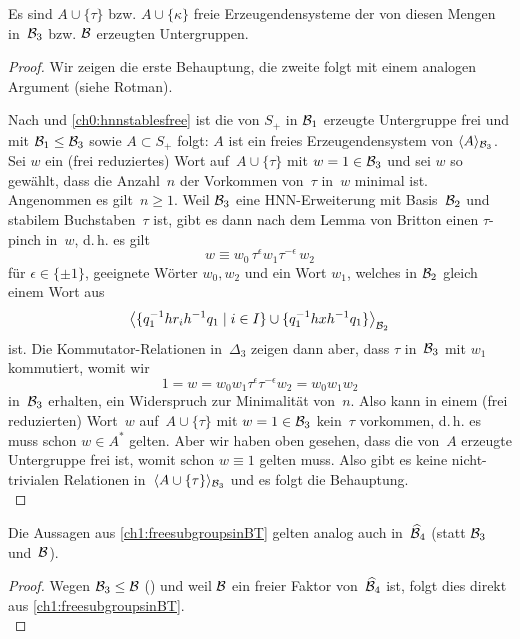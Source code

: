 \begin{thLemma}\label{ch1:freesubgroupsinBT}
    Es sind $A\cup\{\tau\}$ bzw. $A\cup\{\kappa\}$ freie
    Erzeugendensysteme der von diesen Mengen in~$\BT_3$ bzw.
    $\BT$ erzeugten Untergruppen.
\end{thLemma}
%
\begin{proof}
    Wir zeigen die erste Behauptung, die zweite folgt mit einem
    analogen Argument (siehe Rotman\cite[Lemma~12.21]{bookc:rotman95}).
    
    Nach  und \cref{ch0:hnnstablesfree}
    ist die von $S_+$ in $\BT_1$ erzeugte Untergruppe frei
    und mit $\BT_1 \leq \BT_3$ sowie $A\subset S_+$ folgt:
    $A$ ist ein freies Erzeugendensystem von $\Spann{A}_{\BT_3}$.
    Sei $w$ ein (frei reduziertes) Wort auf~$A\cup\{\tau\}$
    mit $w=1\in\BT_3$ und sei $w$ so gewählt, dass die Anzahl~$n$
    der Vorkommen von~$\tau$ in~$w$ minimal ist. Angenommen es gilt~$n\geq1$.
    Weil $\BT_3$ eine HNN-Erweiterung mit Basis~$\BT_2$ und stabilem
    Buchstaben~$\tau$ ist, gibt es dann nach dem Lemma von Britton
     einen $\tau$-pinch in~$w$, d.\,h. es gilt
    \[ w \equiv w_0 \, \tau^\epsilon w_1 \tau^{-\epsilon} \, w_2 \]
    für $\epsilon\in\{\pm1\}$, geeignete Wörter $w_0,w_2$ und
    ein Wort $w_1$, welches in $\BT_2$ gleich einem Wort aus
    \[ \Spann[\big]{
            \{q_1\inv hr_ih\inv q_1 \nMid i\in I\}
            \cup\{q_1\inv hxh\inv q_1\}
        }_{\BT_2}
    \]
    ist. Die Kommutator-Relationen in~$\Delta_3$ zeigen dann aber, dass
    $\tau$ in~$\BT_3$ mit $w_1$ kommutiert, womit wir
    \[ 1 = w = w_0 w_1 \tau^\epsilon \tau^{-\epsilon} w_2 = w_0w_1w_2
    \]
    in~$\BT_3$ erhalten, ein Widerspruch zur Minimalität von~$n$.
    Also kann in einem (frei reduzierten) Wort~$w$ auf~$A\cup\{\tau\}$
    mit $w=1\in\BT_3$ kein~$\tau$ vorkommen, d.\,h. es muss schon
    $w\in A^*$ gelten. Aber wir haben oben gesehen, dass die von~$A$
    erzeugte Untergruppe frei ist, womit schon $w\equiv1$ gelten muss.
    Also gibt es keine nicht-trivialen Relationen
    in~$\Spann{A\cup\{\tau\}}_{\BT_3}$ und es folgt die Behauptung.
    \\
\end{proof}

\begin{thKorollar}\label{ch1:freesubgroupsinhBT4}
    Die Aussagen aus \cref{ch1:freesubgroupsinBT} gelten analog auch
    in~$\hBT_4$ (statt $\BT_3$ und~$\BT$).
\end{thKorollar}
%
\begin{proof}
    Wegen $\BT_3\leq\BT$ () und
    weil $\BT$ ein freier Faktor von~$\hBT_4$ ist, folgt dies
    direkt aus \cref{ch1:freesubgroupsinBT}.
    \\
\end{proof}

